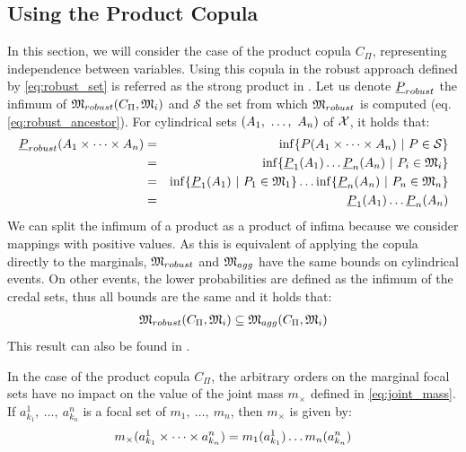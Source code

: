 \subsection{Using the Product Copula}\label{subsection:product_copula}
In this section, we will consider the case of the product copula $C_\Pi$, representing independence between variables. Using this copula in the robust approach defined by \cref{eq:robust_set} is referred as the strong product in \cite{kacprzyk_factorisation_2010}. Let us denote $\underline{P}_{robust}$ the infimum of $\mathfrak{M}_{robust}(C_\Pi, \mathfrak{M}_i)$ and $\mathcal{S}$ the set from which $\mathfrak{M}_{robust}$ is computed (eq. \eqref{eq:robust_ancestor}).
For cylindrical sets $(A_1 , ~\dots, ~ A_n)$ of $\mathcal{X}$, it holds that:
\begin{eqnarray*}
    \underline{P}_{robust}(A_1\times\dots\times A_n) &=& \inf\{P(A_1\times\dots\times A_n)~|~P\in\mathcal{S}\}\\
    &=&\inf\{\underline{P}_1(A_1)\dots\underline{P}_n(A_n)~|~P_i\in\mathfrak{M}_i\}\\
    &=&\inf\{\underline{P}_1(A_1)~|~P_1\in\mathfrak{M}_1\}\dots\inf\{\underline{P}_n(A_n)~|~P_n\in\mathfrak{M}_n\}\\
    &=&\underline{P}_1(A_1)\dots\underline{P}_n(A_n)
\end{eqnarray*}
We can split the infimum of a product as a product of infima because we consider mappings with positive values. As this is equivalent of applying the copula directly to the marginals, $\mathfrak{M}_{robust}$ and $\mathfrak{M}_{agg}$ have the same bounds on cylindrical events. On other events, the lower probabilities are defined as the infimum of the credal sets, thus all bounds are the same and it holds that:
\begin{eqnarray}
    \mathfrak{M}_{robust}(C_\Pi, \mathfrak{M}_i)\subseteq\mathfrak{M}_{agg}(C_\Pi, \mathfrak{M}_i)
\end{eqnarray}
This result can also be found in \cite{couso_survey_2000}.
\begin{proposition}
    In the case of the product copula $C_\Pi$, the arbitrary orders on the marginal focal sets have no impact on the value of the joint mass $m_\times$ defined in \eqref{eq:joint_mass}. If $a^1_{k_1}, ~\dots, ~a^n_{k_n}$ is a focal set of $m_1, ~\dots, ~m_n$, then $m_\times$ is given by:
    \begin{eqnarray}\label{eq:joint_mass_product}
        m_\times(a^1_{k_1}\times\dots\times a^n_{k_n}) = m_1(a^1_{k_1})\dots m_n(a^n_{k_n})
    \end{eqnarray}
\end{proposition}

